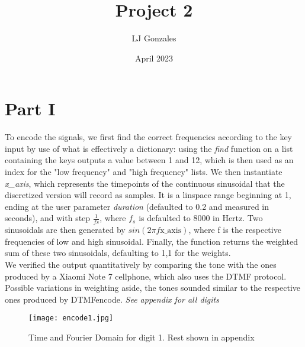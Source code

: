 \documentclass{article}
\title{Project 2}
\author{LJ Gonzales}
\date{April 2023}
\begin{document}
\maketitle
\section{Part I}
To encode the signals, we first find the correct frequencies according to the key input by use of what is effectively a dictionary: using the \emph{find} function on a list containing the keys outputs a value between 1 and 12, which is then used as an index for the "low frequency" and "high frequency" lists. 
We then instantiate \emph{x\_axis}, which represents the timepoints of the continuous sinusoidal that the discretized version will record as samples.
It is a linspace range beginning at 1, ending at the user parameter \emph{duration} (defaulted to 0.2 and measured in seconds), and with step $\frac{1}{fs}$, where $f_s$ is defaulted to 8000 in Hertz.
Two sinusoidals are then generated by $sin(2\pi f\text{x\_axis})$, where f is the respective frequencies of low and high sinusoidal.
Finally, the function returns the weighted sum of these two sinusoidals, defaulting to 1,1 for the weights. \\
We verified the output quantitatively by comparing the tone with the ones produced by a Xiaomi Note 7 cellphone, which also uses the DTMF protocol. Possible variations in weighting aside, the tones sounded similar to the respective ones produced by DTMFencode. \emph{See appendix for all digits}
\begin{figure}[h]
	\texttt{[image: encode1.jpg]}
	\caption{Time and Fourier Domain for digit 1. Rest shown in appendix}
	\label{encode1}
\end{figure}
\end{document}
